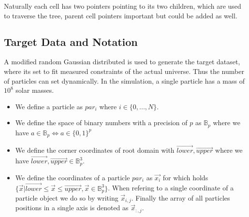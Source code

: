 \documentclass[]{article}
\begin{document}
Naturally each cell has two pointers pointing to its two children, which are used to traverse the tree, parent cell pointers important but could be added as well.


\subsection{Target Data and Notation}\label{sec:target-data}

\begin{comment}
The target data consists of $N$ particles where we use the following notations:

constrained realization
Gaussian random distribution, modified to match the measured power.

The higher the resolution the more accurate the result.

Large scales are more uniform, small scale 

smallest thing you want to be able to resolve. 

boxes around a giga parsec

want to be able to resolve galaxies, milky way 10^12 solar masses,

want to be able to resolve smaller galaxies, 10^8 for a single particle
Imp 
\end{comment}
A modified random Gaussian distributed is used to generate the target dataset, where its set to fit measured constraints of the actual universe. Thus the number of particles can set dynamically. In the simulation, a single particle has a mass of $10^8$ solar masses. 


\begin{itemize}
	\item We define a particle as $par_i$  where $i \in \{0,...,N\}$. 
	\item We define the space of binary numbers with a precision of $p$ as $\mathbb{B}_p$ where we have $a \in \mathbb{B}_p \Leftrightarrow a \in \{0,1\}^{p}$
	\item We define the corner coordinates of root domain with $\vec{lower}, \vec{upper}$ where we have $\vec{lower}, \vec{upper} \in \mathbb{B}_p^3$. 
	\item We define the coordinates of a particle $par_i$ as $\vec{x_i}$ for which holds $\{\vec{x} | \vec{lower} \leq \vec{x} \leq \vec{upper}, \vec{x} \in \mathbb{B}_p^3 \}$.
	When refering to a single coordinate of a particle object we do so by writing $\vec{x}_{i,j}$. Finally the array of all particles positions in a single axis is denoted as $\vec{x}_{:,j}$. 
	
\end{itemize}
\end{document}
